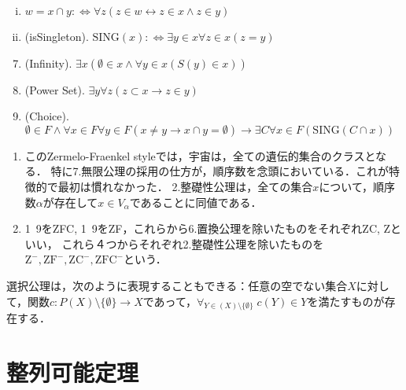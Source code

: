 \documentclass[uplatex,dvipdfmx]{jsreport}
\begin{document}
\begin{shadebox}
\begin{definition}[集合の公理系ZF]
\begin{screen}
\begin{notation}
\begin{enumerate}[(i)]
                    \item $w=x\cap y:\Leftrightarrow\forall z(z\in w\leftrightarrow z\in x\land z\in y)$
                    \item (isSingleton). $\mathrm{SING}(x):\Leftrightarrow\exists y\in x\forall z\in x(z=y)$
                \end{enumerate}
            \end{notation}
        \end{screen}
        \begin{enumerate}\setcounter{enumi}{6}
            \item (Infinity). $\exists x(\emptyset\in x\land \forall y\in x(S(y)\in x))$
            \item (Power Set). $\exists y\forall z(z\subset x\rightarrow z\in y)$
            \item (Choice). $\emptyset\in F\land\forall x\in F\forall y\in F(x\ne y\rightarrow x\cap y=\emptyset)\rightarrow \exists C\forall x\in F(\mathrm{SING}(C\cap x))$
        \end{enumerate}
    \end{definition}
    \vspace{2mm}
\end{shadebox}
\begin{remark}\mbox{}
    \begin{enumerate}
        \item このZermelo-Fraenkel styleでは，宇宙は，全ての遺伝的集合のクラスとなる．
        特に7.無限公理の採用の仕方が，順序数を念頭においている．これが特徴的で最初は慣れなかった．
        2.整礎性公理は，全ての集合$x$について，順序数$\alpha$が存在して$x\in V_\alpha$であることに同値である．
        \item 1~9をZFC, 1~9をZF，これらから6.置換公理を除いたものをそれぞれZC, Zといい，
        これら４つからそれぞれ2.整礎性公理を除いたものを$\mathrm{Z^-,ZF^-,ZC^-,ZFC^-}$という．
    \end{enumerate} 
\end{remark}

\begin{axiom}
    選択公理は，次のように表現することもできる：任意の空でない集合$X$に対して，関数$c:P(X)\setminus\{\emptyset\}\to X$であって，$\forall_{Y\in (X)\setminus\{\emptyset\}}\;c(Y)\in Y$を満たすものが存在する．
\end{axiom}

\section{整列可能定理}
\end{document}
